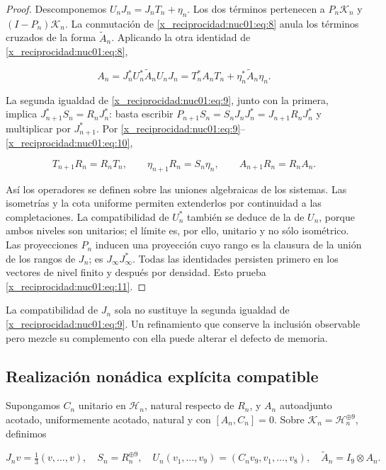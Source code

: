 \begin{proof}
Descomponemos \(U_nJ_n=J_nT_n+\eta_n\). Los dos términos pertenecen a \(P_n\mathscr K_n\) y \((I-P_n)\mathscr K_n\). La conmutación de \eqref{x_reciprocidad:nuc01:eq:8} anula los términos cruzados de la forma \(\widetilde A_n\). Aplicando la otra identidad de \eqref{x_reciprocidad:nuc01:eq:8},

\[
A_n=J_n^*U_n^*\widetilde A_nU_nJ_n
=T_n^*A_nT_n+\eta_n^*\widetilde A_n\eta_n.
\]

La segunda igualdad de \eqref{x_reciprocidad:nuc01:eq:9}, junto con la primera, implica
\(J_{n+1}^*S_n=R_nJ_n^*\): basta escribir
\(P_{n+1}S_n=S_nJ_nJ_n^*=J_{n+1}R_nJ_n^*\) y multiplicar por \(J_{n+1}^*\).
Por \eqref{x_reciprocidad:nuc01:eq:9}–\eqref{x_reciprocidad:nuc01:eq:10},

\[
T_{n+1}R_n=R_nT_n,\qquad
\eta_{n+1}R_n=S_n\eta_n,\qquad
A_{n+1}R_n=R_nA_n.
\]

Así los operadores se definen sobre las uniones algebraicas de los sistemas. Las isometrías y la cota uniforme permiten extenderlos por continuidad a las completaciones. La compatibilidad de \(U_n^*\) también se deduce de la de \(U_n\), porque ambos niveles son unitarios; el límite es, por ello, unitario y no sólo isométrico. Las proyecciones \(P_n\) inducen una proyección cuyo rango es la clausura de la unión de los rangos de \(J_n\); es \(J_\infty J_\infty^*\). Todas las identidades persisten primero en los vectores de nivel finito y después por densidad. Esto prueba \eqref{x_reciprocidad:nuc01:eq:11}.
\end{proof}

La compatibilidad de \(J_n\) sola no sustituye la segunda igualdad de \eqref{x_reciprocidad:nuc01:eq:9}. Un refinamiento que conserve la inclusión observable pero mezcle su complemento con ella puede alterar el defecto de memoria.

\subsection{Realización nonádica explícita compatible}

Supongamos \(C_n\) unitario en \(\mathscr H_n\), natural respecto de \(R_n\), y \(A_n\) autoadjunto acotado, uniformemente acotado, natural y con \([A_n,C_n]=0\). Sobre \(\mathscr K_n=\mathscr H_n^{\oplus9}\), definimos

\[
J_nv=\tfrac13(v,\ldots,v),\quad
S_n=R_n^{\oplus9},\quad
U_n(v_1,\ldots,v_9)=(C_nv_9,v_1,\ldots,v_8),
\quad \widetilde A_n=I_9\otimes A_n.
\]

